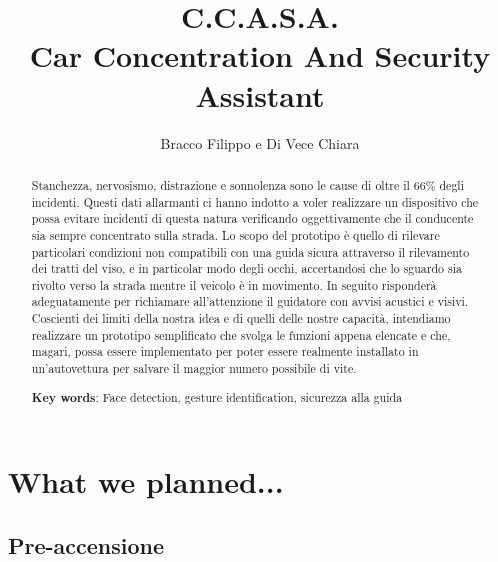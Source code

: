 \documentclass[12pt]{article}
\begin{document}
\title{C.C.A.S.A. \\
	Car Concentration And Security Assistant}
\author{Bracco Filippo e Di Vece Chiara}
\maketitle

	
	\begin{abstract}
		
		\begin{center}
			Stanchezza, nervosismo, distrazione e sonnolenza sono le cause di oltre il 66\% degli incidenti. Questi dati allarmanti ci hanno indotto a voler realizzare un dispositivo che possa evitare incidenti di questa natura verificando oggettivamente che il conducente sia sempre concentrato sulla strada. Lo scopo del prototipo \`{e} quello di rilevare particolari condizioni non compatibili con una guida sicura attraverso il rilevamento dei tratti del viso, e in particolar modo degli occhi, accertandosi che lo sguardo sia rivolto verso la strada mentre il veicolo \`{e} in movimento. In seguito risponder\`{a} adeguatamente per richiamare all'attenzione il guidatore con avvisi acustici e visivi. Coscienti dei limiti della nostra idea e di quelli delle nostre capacit\`{a}, intendiamo realizzare un prototipo semplificato che svolga le funzioni appena elencate e che, magari, possa essere implementato per poter essere realmente installato in un'autovettura per salvare il maggior numero possibile di vite.
			
		\end{center}
		
		
		\begin{center}
			
			\textbf{Key words}: Face detection, gesture identification, sicurezza alla guida
			
		\end{center}
		
		
	\end{abstract}
	
	\pagebreak
	
	\section{What we planned...}
	
	\subsection{Pre-accensione}
	
\end{document}
